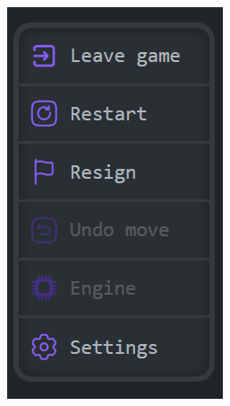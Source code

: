 \documentclass[12pt,a4paper]{article}
\begin{document}
\begin{minipage}[t]{0.2\textwidth} 
    \vspace{0pt} 
    \centering 
    \includegraphics[width=\linewidth]{images/ins_min_eopt.png} 
\end{minipage}

\vspace{1cm}
\end{document}
